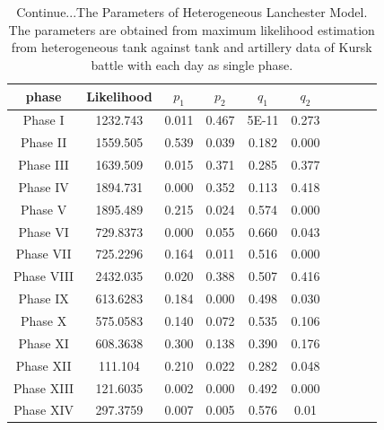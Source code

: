 \documentclass[]{article}
\begin{document}
\begin{table}
\tiny
\caption{Continue...The Parameters of Heterogeneous Lanchester Model. The parameters are obtained from maximum likelihood estimation from heterogeneous tank against tank and artillery data of Kursk battle with each day as single phase.}
{\begin{tabular}{|c|c|c|c|c|c|c|c|c|c|}   \hline\hline
phase & Likelihood  &	\bf${p_1}$&	\bf${p_2}$&	\bf${q_1}$&	\bf${q_2}$	 \\
\hline
\hline
Phase I &1232.743& 0.011& 0.467 &5E-11 &0.273\\
\hline
Phase II &1559.505 &0.539 &0.039 &0.182 &0.000\\
\hline
Phase III& 1639.509& 0.015 &0.371 &0.285 &0.377\\
\hline
Phase IV &1894.731& 0.000 &0.352 &0.113 &0.418\\
\hline
Phase V &1895.489 &0.215 &0.024 &0.574 &0.000\\
\hline
Phase VI &729.8373 &0.000 &0.055 &0.660& 0.043\\
\hline
Phase VII &725.2296 &0.164& 0.011 &0.516& 0.000\\
\hline
Phase VIII& 2432.035 &0.020& 0.388 &0.507& 0.416\\
\hline
Phase IX &613.6283 &0.184& 0.000 &0.498& 0.030\\
\hline
Phase X &575.0583 &0.140 &0.072& 0.535 &0.106\\
\hline
Phase XI &608.3638 &0.300 &0.138 &0.390 &0.176\\
\hline
Phase XII &111.104 &0.210 &0.022 &0.282 &0.048\\
\hline
Phase XIII &121.6035 &0.002 &0.000 &0.492 &0.000\\
\hline
Phase XIV &297.3759 &0.007 &0.005 &0.576 &0.01\\
\hline
\hline
\end{tabular}}
\end{table}
\end{document}

